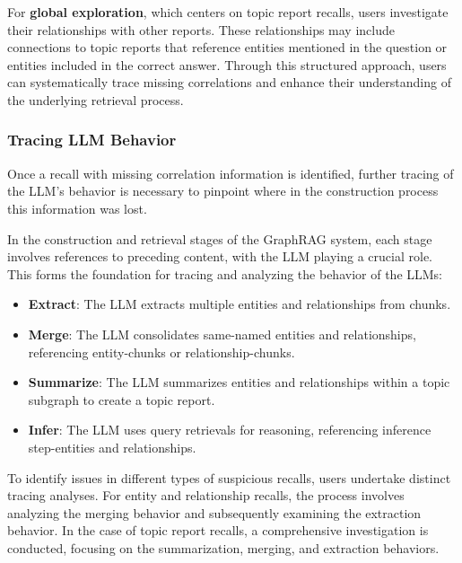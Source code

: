 For \textbf{global exploration}, which centers on topic report recalls, users investigate their relationships with other reports. These relationships may include connections to topic reports that reference entities mentioned in the question or entities included in the correct answer. Through this structured approach, users can systematically trace missing correlations and enhance their understanding of the underlying retrieval process.

\subsubsection{Tracing LLM Behavior}

Once a recall with missing correlation information is identified, further tracing of the LLM's behavior is necessary to pinpoint where in the construction process this information was lost.

In the construction and retrieval stages of the GraphRAG system, each stage involves references to preceding content, with the LLM playing a crucial role. This forms the foundation for tracing and analyzing the behavior of the LLMs:

\begin{itemize}
    \item \textbf{Extract}: The LLM extracts multiple entities and relationships from chunks.
    \item \textbf{Merge}: The LLM consolidates same-named entities and relationships, referencing entity-chunks or relationship-chunks.
    \item \textbf{Summarize}: The LLM summarizes entities and relationships within a topic subgraph to create a topic report.
    \item \textbf{Infer}: The LLM uses query retrievals for reasoning, referencing inference step-entities and relationships.
\end{itemize}

To identify issues in different types of suspicious recalls, users undertake distinct tracing analyses. For entity and relationship recalls, the process involves analyzing the merging behavior and subsequently examining the extraction behavior. In the case of topic report recalls, a comprehensive investigation is conducted, focusing on the summarization, merging, and extraction behaviors.